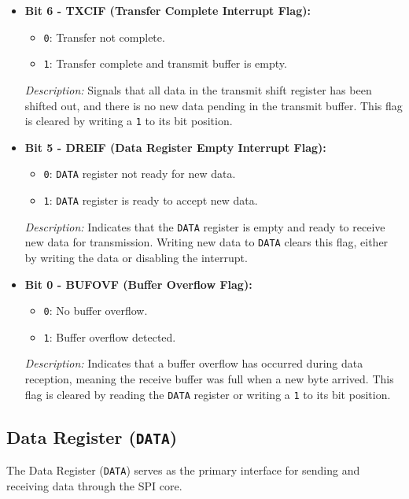   \begin{itemize}
      
      \item \textbf{Bit 6 - TXCIF (Transfer Complete Interrupt Flag):} 
      \begin{itemize}
          \item \texttt{0}: Transfer not complete.
          \item \texttt{1}: Transfer complete and transmit buffer is empty.
      \end{itemize}
      \textit{Description:} Signals that all data in the transmit shift register has been shifted out, and there is no new data pending in the transmit buffer. This flag is cleared by writing a \texttt{1} to its bit position.
      
      \item \textbf{Bit 5 - DREIF (Data Register Empty Interrupt Flag):} 
      \begin{itemize}
          \item \texttt{0}: \texttt{DATA} register not ready for new data.
          \item \texttt{1}: \texttt{DATA} register is ready to accept new data.
      \end{itemize}
      \textit{Description:} Indicates that the \texttt{DATA} register is empty and ready to receive new data for transmission. Writing new data to \texttt{DATA} clears this flag, either by writing the data or disabling the interrupt.
      
      \item \textbf{Bit 0 - BUFOVF (Buffer Overflow Flag):} 
      \begin{itemize}
          \item \texttt{0}: No buffer overflow.
          \item \texttt{1}: Buffer overflow detected.
      \end{itemize}
      \textit{Description:} Indicates that a buffer overflow has occurred during data reception, meaning the receive buffer was full when a new byte arrived. This flag is cleared by reading the \texttt{DATA} register or writing a \texttt{1} to its bit position.
  \end{itemize}
  
  \subsection{Data Register (\texttt{DATA})}
  \label{sec:data_register}
  The Data Register (\texttt{DATA}) serves as the primary interface for sending and receiving data through the SPI core.
  
